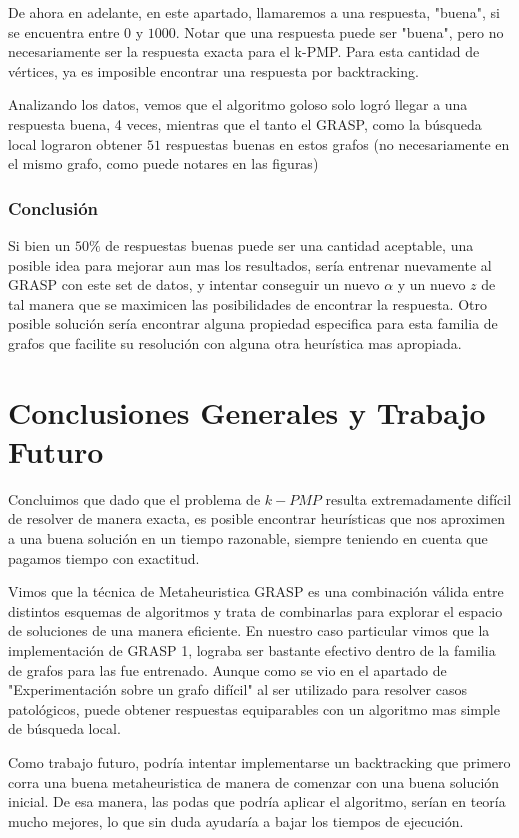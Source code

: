 De ahora en adelante, en este apartado, llamaremos a una respuesta, "buena", si se encuentra entre 0 y $1000$. Notar que una respuesta puede ser "buena", pero no necesariamente ser la respuesta exacta para el k-PMP. Para esta cantidad de vértices, ya es imposible encontrar una respuesta por backtracking.

Analizando los datos, vemos que el algoritmo goloso solo logró llegar a una respuesta buena, 4 veces, mientras que el tanto el GRASP, como la búsqueda local lograron obtener $51$ respuestas buenas en estos grafos (no necesariamente en el mismo grafo, como puede notares en las figuras)

\subsubsection{Conclusión}

Si bien un $50 \%$ de respuestas buenas puede ser una cantidad aceptable, una posible idea para mejorar aun mas los resultados, sería entrenar nuevamente al GRASP con este set de datos, y intentar conseguir un nuevo $\alpha$ y un nuevo $z$ de tal manera que se maximicen las posibilidades de encontrar la respuesta. Otro posible solución sería encontrar alguna propiedad especifica para esta familia de grafos que facilite su resolución con alguna otra heurística mas apropiada.

\section{Conclusiones Generales y Trabajo Futuro}

Concluimos que dado que el problema de $k-PMP$ resulta extremadamente difícil de resolver de manera exacta, es posible encontrar heurísticas que nos aproximen a una buena solución en un tiempo razonable, siempre teniendo en cuenta que pagamos tiempo con exactitud.

Vimos que la técnica de Metaheuristica GRASP es una combinación válida entre distintos esquemas de algoritmos y trata de combinarlas para explorar el espacio de soluciones de una manera eficiente. En nuestro caso particular vimos que la implementación de GRASP 1, lograba ser bastante efectivo dentro de la familia de grafos para las fue entrenado. Aunque como se vio en el apartado de "Experimentación sobre un grafo difícil" al ser utilizado para resolver casos patológicos, puede obtener respuestas equiparables con un algoritmo mas simple de búsqueda local.

Como trabajo futuro, podría intentar implementarse un backtracking que primero corra una buena metaheuristica de manera de comenzar con una buena solución inicial. De esa manera, las podas que podría aplicar el algoritmo, serían en teoría mucho mejores, lo que sin duda ayudaría a bajar los tiempos de ejecución.
